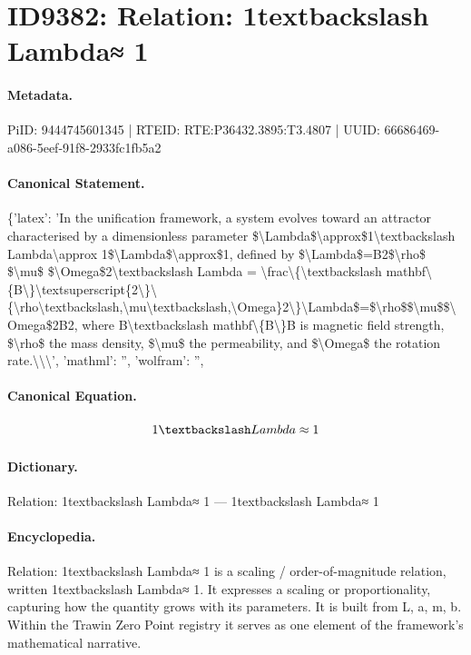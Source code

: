 \section*{ID9382: Relation: 1textbackslash Lambda≈ 1}
\paragraph{Metadata.}
PiID: 9444745601345 | RTEID: RTE:P36432.3895:T3.4807 | UUID: 66686469-a086-5eef-91f8-2933fc1fb5a2

\paragraph{Canonical Statement.}
\{'latex': 'In the unification framework, a system evolves toward an attractor characterised by a dimensionless parameter \$\textbackslash{}Lambda\$\textbackslash{}approx\$1\textbackslash{}textbackslash Lambda\textbackslash{}approx 1\$\textbackslash{}Lambda\$\textbackslash{}approx\$1, defined by \$\textbackslash{}Lambda\$=B2\$\textbackslash{}rho\$ \$\textbackslash{}mu\$ \$\textbackslash{}Omega\$2\textbackslash{}textbackslash Lambda = \textbackslash{}frac\textbackslash{}\{\textbackslash{}textbackslash mathbf\textbackslash{}\{B\textbackslash{}\}\textbackslash{}textsuperscript\{2\textbackslash{}\}\textbackslash{}\{\textbackslash{}rho\textbackslash{}textbackslash,\textbackslash{}mu\textbackslash{}textbackslash,\textbackslash{}Omega\}2\textbackslash{}\}\textbackslash{}Lambda\$=\$\textbackslash{}rho\$\$\textbackslash{}mu\$\$\textbackslash{}Omega\$2B2, where B\textbackslash{}textbackslash mathbf\textbackslash{}\{B\textbackslash{}\}B is magnetic field strength, \$\textbackslash{}rho\$ the mass density, \$\textbackslash{}mu\$ the permeability, and \$\textbackslash{}Omega\$ the rotation rate.\textbackslash{}\textbackslash{}\textbackslash{}', 'mathml': '', 'wolfram': '',

\paragraph{Canonical Equation.}
\[
1\textbackslash Lambda\approx 1
\]

\paragraph{Dictionary.}
Relation: 1textbackslash Lambda≈ 1 — 1textbackslash Lambda≈ 1

\paragraph{Encyclopedia.}
Relation: 1textbackslash Lambda≈ 1 is a scaling / order-of-magnitude relation, written 1textbackslash Lambda≈ 1. It expresses a scaling or proportionality, capturing how the quantity grows with its parameters. It is built from L, a, m, b. Within the Trawin Zero Point registry it serves as one element of the framework's mathematical narrative.
